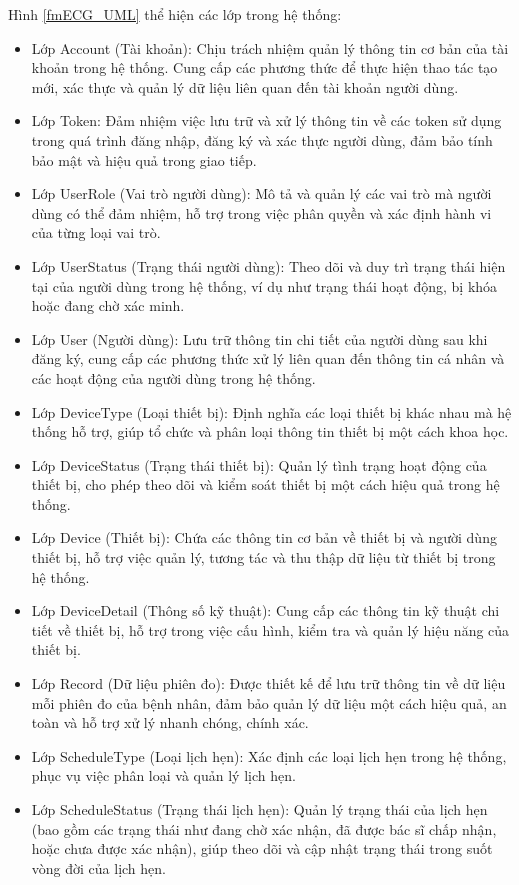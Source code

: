 Hình \ref*{fmECG_UML} thể hiện các lớp trong hệ thống:
\begin{itemize}
	\item Lớp Account (Tài khoản): Chịu trách nhiệm quản lý thông tin cơ bản của tài khoản trong hệ thống. Cung cấp các phương thức để thực hiện thao tác tạo mới, xác thực và quản lý dữ liệu liên quan đến tài khoản người dùng.
	\item Lớp Token: Đảm nhiệm việc lưu trữ và xử lý thông tin về các token sử dụng trong quá trình đăng nhập, đăng ký và xác thực người dùng, đảm bảo tính bảo mật và hiệu quả trong giao tiếp.
	\item Lớp UserRole (Vai trò người dùng): Mô tả và quản lý các vai trò mà người dùng có thể đảm nhiệm, hỗ trợ trong việc phân quyền và xác định hành vi của từng loại vai trò.
	\item Lớp UserStatus (Trạng thái người dùng): Theo dõi và duy trì trạng thái hiện tại của người dùng trong hệ thống, ví dụ như trạng thái hoạt động, bị khóa hoặc đang chờ xác minh.
	\item Lớp User (Người dùng): Lưu trữ thông tin chi tiết của người dùng sau khi đăng ký, cung cấp các phương thức xử lý liên quan đến thông tin cá nhân và các hoạt động của người dùng trong hệ thống.
	\item Lớp DeviceType (Loại thiết bị): Định nghĩa các loại thiết bị khác nhau mà hệ thống hỗ trợ, giúp tổ chức và phân loại thông tin thiết bị một cách khoa học.
	\item Lớp DeviceStatus (Trạng thái thiết bị): Quản lý tình trạng hoạt động của thiết bị, cho phép theo dõi và kiểm soát thiết bị một cách hiệu quả trong hệ thống.
	\item Lớp Device (Thiết bị): Chứa các thông tin cơ bản về thiết bị và người dùng thiết bị, hỗ trợ việc quản lý, tương tác và thu thập dữ liệu từ thiết bị trong hệ thống.
	\item Lớp DeviceDetail (Thông số kỹ thuật): Cung cấp các thông tin kỹ thuật chi tiết về thiết bị, hỗ trợ trong việc cấu hình, kiểm tra và quản lý hiệu năng của thiết bị.
	\item Lớp Record (Dữ liệu phiên đo): Được thiết kế để lưu trữ thông tin về dữ liệu mỗi phiên đo của bệnh nhân, đảm bảo quản lý dữ liệu một cách hiệu quả, an toàn và hỗ trợ xử lý nhanh chóng, chính xác.
	\item Lớp ScheduleType (Loại lịch hẹn): Xác định các loại lịch hẹn trong hệ thống, phục vụ việc phân loại và quản lý lịch hẹn.
	\item Lớp ScheduleStatus (Trạng thái lịch hẹn): Quản lý trạng thái của lịch hẹn (bao gồm các trạng thái như đang chờ xác nhận, đã được bác sĩ chấp nhận, hoặc chưa được xác nhận), giúp theo dõi và cập nhật trạng thái trong suốt vòng đời của lịch hẹn.

\end{itemize}
